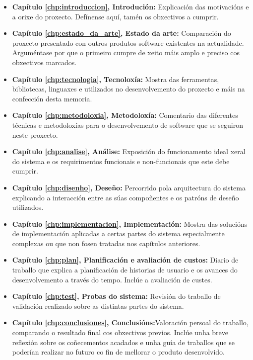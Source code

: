 \begin{itemize}
	\item \textbf{Capítulo \ref{chp:introduccion}, Introdución:} Explicación das motivacións e a orixe do proxecto. Defínense aquí, tamén os obxectivos a cumprir.
	\item \textbf{Capítulo \ref{chp:estado_da_arte}, Estado da arte:} Comparación do proxecto presentado con outros produtos software existentes na actualidade. Arguméntase por que o primeiro cumpre de xeito máis amplo e preciso cos obxectivos marcados.
	\item \textbf{Capítulo \ref{chp:tecnologia}, Tecnoloxía:} Mostra das ferramentas, bibliotecas, linguaxes e  utilizados no desenvolvemento do proxecto e máis na confección desta memoria.
	\item \textbf{Capítulo \ref{chp:metodoloxia}, Metodoloxía:} Comentario das diferentes técnicas e metodoloxías para o desenvolvemento de software que se seguiron neste proxecto.
	\item \textbf{Capítulo \ref{chp:analise}, Análise:} Exposición do funcionamento ideal xeral do sistema e os requirimentos funcionais e non-funcionais que este debe cumprir.
	\item \textbf{Capítulo \ref{chp:disenho}, Deseño:} Percorrido pola arquitectura do sistema explicando a interacción entre as súas compoñentes e os patróns de deseño utilizados.
 	\item \textbf{Capítulo \ref{chp:implementacion}, Implementación:} Mostra das solucións de implementación aplicadas a certas partes do sistema especialmente complexas ou que non fosen tratadas nos capítulos anteriores.
 	\item \textbf{Capítulo \ref{chp:plan}, Planificación e avaliación de custos:} Diario de traballo que explica a planificación de historias de usuario e os avances do desenvolvemento a través do tempo. Inclúe a avaliación de custes.
 	\item \textbf{Capítulo \ref{chp:test}, Probas do sistema:} Revisión do traballo de validación realizado sobre as distintas partes do sistema.
 	\item \textbf{Capítulo \ref{chp:conclusiones}, Conclusións:}Valoración persoal do traballo, comparando o resultado final cos obxectivos previos. Inclúe unha breve reflexión sobre os coñecementos acadados e unha guía de traballos que se poderían realizar no futuro co fin de mellorar o produto desenvolvido.
	
\end{itemize}


